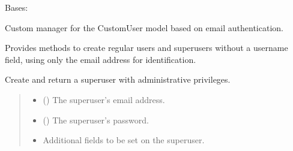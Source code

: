 \documentclass[letterpaper,10pt,english]{sphinxmanual}
\begin{document}
\begin{fulllineitems}
\label{\detokenize{users:users.models.CustomUserManager}}
\pysigstartsignatures
\pysiglinewithargsret
{}
{\sphinxparamcomma {}}
{}
\pysigstopsignatures
\sphinxAtStartPar
Bases: 

\sphinxAtStartPar
Custom manager for the CustomUser model based on email authentication.

\sphinxAtStartPar
Provides methods to create regular users and superusers without a username field,
using only the email address for identification.

\begin{fulllineitems}
\label{\detokenize{users:users.models.CustomUserManager.create_superuser}}
\pysigstartsignatures
\pysiglinewithargsret
{}
{\sphinxparamcomma {}\sphinxparamcomma {}}
{}
\pysigstopsignatures
\sphinxAtStartPar
Create and return a superuser with administrative privileges.
\begin{quote}\begin{description}
\begin{itemize}
\item {} 
\sphinxAtStartPar
{} () \textendash{} The superuser’s email address.

\item {} 
\sphinxAtStartPar
{} (\sphinxstyleliteralemphasis{\sphinxupquote{, }}) \textendash{} The superuser’s password.

\item {} 
\sphinxAtStartPar
{} \textendash{} Additional fields to be set on the superuser.


\end{itemize}
\end{description}
\end{quote}
\end{fulllineitems}
\end{fulllineitems}
\end{document}
